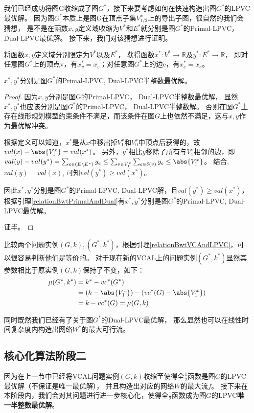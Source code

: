 我们已经成功将图G收缩成了图$G^*$，接下来要考虑如何在快速构造出图$G^*$的LPVC最优解。
因为图$G^*$本质上是图G在顶点子集$V^x_{1/2}$上的导出子图，很自然的我们会猜想，
是不是在函数$x,y$定义域收缩为$V^*$和$E^*$就分别是图$G^*$的Primal-LPVC， Dual-LPVC最优解。
接下来，我们对该猜想进行证明。

将函数$x,y$定义域分别限定为$V^*$以及$E^*$，
获得函数$x^*:V^* \rightarrow \mathbb{R}$及$y^*:E^* \rightarrow \mathbb{R}$，
即对任意图$G^*$上的顶点v，有$x^*_v=x_v$；对任意图$G^*$上的边e，有$x^*_e=x_e$。
\begin{claim}
$x^*, y^*$分别是图$G^*$的Primal-LPVC, Dual-LPVC半整数最优解。
\end{claim}
\begin{proof}
因为$x, y$分别是图G的Primal-LPVC， Dual-LPVC半整数最优解，
显然$x^*, y^*$也应该分别是图$G^*$的Primal-LPVC， Dual-LPVC半整数解。
否则在图$G^*$上存在线形规划模型约束条件不满足，而该条件在图$G$上也依然不满足，这与$x,y$作为最优解冲突。

根据定义可以知道，$x^*$是从$x$中移出掉$V^x_1$和$V^x_0$中顶点后获得的，故$val(x) - \abs{V^x_1} = val(x^*)$。
另外，$y^*$相比$y$移除了所有与$V^x_1$相邻的边，即$val(y) - val(y^*) = \sum_{e \in (E \setminus E^*)}{y_e}
\le \sum_{v \in V^x_1}{\sum_{e \in \delta(v)}{y_e}}\le\abs{V^x_1}$。
结合, $val(y) = val(x)$, 可知$val(y^*) \ge val(x^*)$。

因此$x^*, y^*$分别是图$G^*$的Primal-LPVC, Dual-LPVC解，且$val(y^*) \ge val(x^*)$，
根据引理\ref{relationBwtPrimalAndDual}有$x^*, y^*$分别是图$G^*$的Primal-LPVC, Dual-LPVC最优解。

证毕。
\end{proof}

比较两个问题实例$(G, k), (G^*, k^*)$，根据引理\ref{relationBwtVCAndLPVC}，可以很容易判断他们是等价的。
对于现在新的VCAL上的问题实例$(G^*, k^*)$显然其参数相比于原实例$(G, k)$保持了不变，如下：
\begin{equation*} \begin{aligned}
  \mu(G^*, k^*) &= k^* - vc^*(G^*) \\
                &= (k - \abs{V^x_1}) - (vc^*(G) - \abs{V^x_1}) \\
                &= k - vc^*(G) = \mu(G, k)
\end{aligned} \end{equation*}

同时既然我们已经有了关于图$G^*$的Dual-LPVC最优解，
那么显然也可以在线性时间复杂度内构造出网络$W^*$的最大可行流。

\subsection{核心化算法阶段二}
因为在上一节中已经将VCAL问题实例$(G, k)$收缩至使得全$\frac{1}{2}$函数是图$G$的LPVC最优解（不保证是唯一最优解），
并且构造出对应的网络$W$的最大流$f$。
接下来在本阶段内，我们会对其问题进行进一步核心化，使得全$\frac{1}{2}$函数成为图$G$的LPVC\textbf{唯一半整数最优解}。

